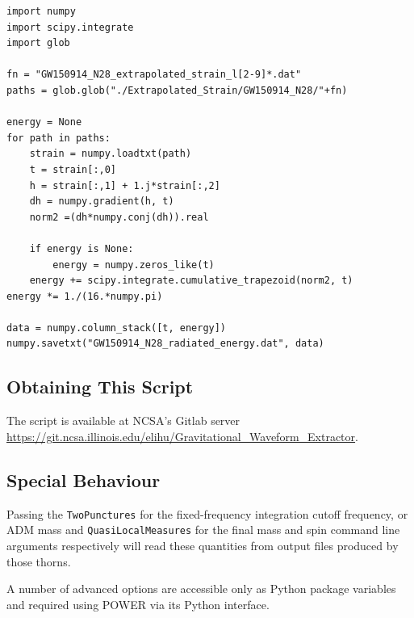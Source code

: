 \begin{verbatim}
import numpy
import scipy.integrate
import glob

fn = "GW150914_N28_extrapolated_strain_l[2-9]*.dat"
paths = glob.glob("./Extrapolated_Strain/GW150914_N28/"+fn)

energy = None
for path in paths:
    strain = numpy.loadtxt(path)
    t = strain[:,0]
    h = strain[:,1] + 1.j*strain[:,2]
    dh = numpy.gradient(h, t)
    norm2 =(dh*numpy.conj(dh)).real
    
    if energy is None:
        energy = numpy.zeros_like(t)
    energy += scipy.integrate.cumulative_trapezoid(norm2, t)
energy *= 1./(16.*numpy.pi)

data = numpy.column_stack([t, energy])
numpy.savetxt("GW150914_N28_radiated_energy.dat", data)
\end{verbatim}

\subsection{Obtaining This Script}

The script is available at NCSA's Gitlab server
\url{https://git.ncsa.illinois.edu/elihu/Gravitational_Waveform_Extractor}.

\subsection{Special Behaviour}

Passing the \texttt{TwoPunctures} for the fixed-frequency integration cutoff
frequency, or ADM mass  and \texttt{QuasiLocalMeasures} for the final mass and
spin command line arguments respectively will read these quantities from
output files produced by those thorns.

A number of advanced options are accessible only as Python package variables
and required using POWER via its Python interface.

